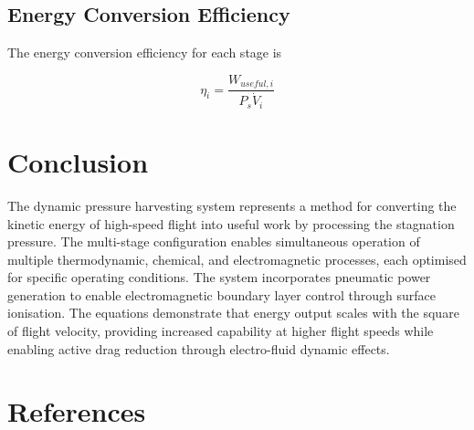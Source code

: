 \documentclass[12pt,a4paper]{article}
\begin{document}
\subsection{Energy Conversion Efficiency}

The energy conversion efficiency for each stage is

\begin{equation}
\eta_i = \frac{W_{useful,i}}{P_s \dot{V}_i}
\end{equation}

\section{Conclusion}

The dynamic pressure harvesting system represents a method for converting the kinetic energy of high-speed flight into useful work by processing the stagnation pressure. The multi-stage configuration enables simultaneous operation of multiple thermodynamic, chemical, and electromagnetic processes, each optimised for specific operating conditions. The system incorporates pneumatic power generation to enable electromagnetic boundary layer control through surface ionisation. The equations demonstrate that energy output scales with the square of flight velocity, providing increased capability at higher flight speeds while enabling active drag reduction through electro-fluid dynamic effects.

\section{References}
\end{document}
